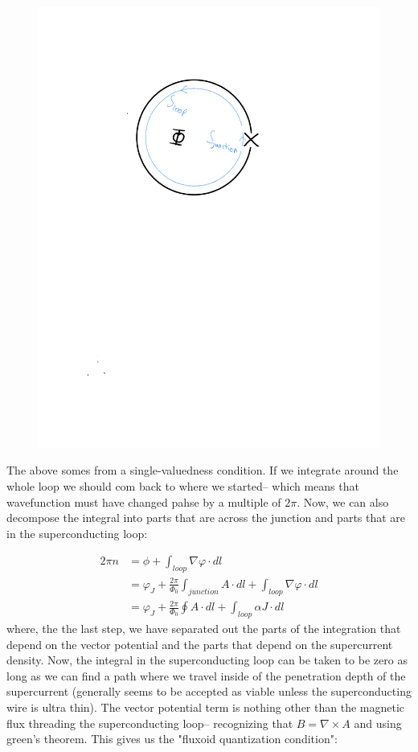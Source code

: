 \documentclass[paper=a4, twocolumn, fontsize=10pt]{article} %
\numberwithin{equation}{section} %
\numberwithin{figure}{section} %
\numberwithin{table}{section} %
\begin{document}
\begin{figure}[H]
    \centering
    \includegraphics[scale=.5]{JJ_loop.pdf}
    \end{figure}

The above somes from a single-valuedness condition. If we integrate around the whole loop we should com back to where we started-- which means that wavefunction must have changed pahse by a multiple of $2\pi$. Now, we can also decompose the integral into parts that are across the junction and parts that are in the superconducting loop:


\begin{align}
    2\pi n &= \phi + \int_{loop} \nabla \varphi \cdot dl
    \\
    &= \varphi_J +  \frac{2\pi}{\Phi_0} \int_{junction} A  \cdot dl + \int_{loop} \nabla \varphi \cdot dl
    \\
    &= \varphi_J +  \frac{2\pi}{\Phi_0} \oint A  \cdot dl + \int_{loop} \alpha J  \cdot dl
\end{align}
where, the the last step, we have separated out the parts of the integration that depend on the vector potential and the parts that depend on the supercurrent density. Now, the integral in the superconducting loop can be taken to be zero as long as we can find a path where we travel inside of the penetration depth of the supercurrent (generally seems to be accepted as viable unless the superconducting wire is ultra thin). The vector potential term is nothing other than the magnetic flux threading the superconducting loop-- recognizing that $B = \nabla \times A$ and using green's theorem. This gives us the "fluxoid quantization condition":
\end{document}
